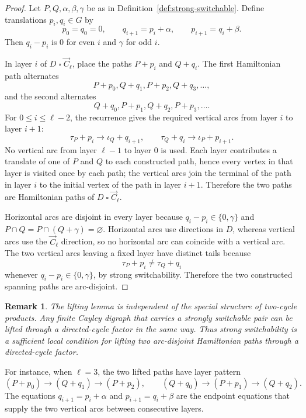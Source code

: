 \documentclass[11pt]{article}
\newtheorem{remark}[theorem]{Remark}
\newcommand{\Boxprod}{\mathbin{\square}}
\begin{document}
\begin{proof}
Let $P,Q,\alpha,\beta,\gamma$ be as in Definition~\ref{def:strong-switchable}.  Define translations $p_i,q_i\in G$ by
\[
        p_0=q_0=0,
        \qquad
        q_{i+1}=p_i+\alpha,
        \qquad
        p_{i+1}=q_i+\beta.
\]
Then $q_i-p_i$ is $0$ for even $i$ and $\gamma$ for odd $i$.

In layer $i$ of $D\Boxprod\vec C_\ell$, place the paths $P+p_i$ and $Q+q_i$.  The first Hamiltonian path alternates
\[
        P+p_0,
        Q+q_1,
        P+p_2,
        Q+q_3,
        \ldots,
\]
and the second alternates
\[
        Q+q_0,
        P+p_1,
        Q+q_2,
        P+p_3,
        \ldots.
\]
For $0\le i\le \ell-2$, the recurrence gives the required vertical arcs from layer $i$ to layer $i+1$:
\[
        \tau_P+p_i\to \iota_Q+q_{i+1},
        \qquad
        \tau_Q+q_i\to \iota_P+p_{i+1}.
\]
No vertical arc from layer $\ell-1$ to layer $0$ is used.  Each layer contributes a translate of one of $P$ and $Q$ to each constructed path, hence every vertex in that layer is visited once by each path; the vertical arcs join the terminal of the path in layer $i$ to the initial vertex of the path in layer $i+1$.  Therefore the two paths are Hamiltonian paths of $D\Boxprod\vec C_\ell$.

Horizontal arcs are disjoint in every layer because $q_i-p_i\in\{0,\gamma\}$ and $P\cap Q=P\cap(Q+\gamma)=\varnothing$.  Horizontal arcs use directions in $D$, whereas vertical arcs use the $\vec C_\ell$ direction, so no horizontal arc can coincide with a vertical arc.  The two vertical arcs leaving a fixed layer have distinct tails because
\[
        \tau_P+p_i\ne\tau_Q+q_i
\]
whenever $q_i-p_i\in\{0,\gamma\}$, by strong switchability.  Therefore the two constructed spanning paths are arc-disjoint.
\end{proof}

\begin{remark}
The lifting lemma is independent of the special structure of two-cycle products.  Any finite Cayley digraph that carries a strongly switchable pair can be lifted through a directed-cycle factor in the same way.  Thus strong switchability is a sufficient local condition for lifting two arc-disjoint Hamiltonian paths through a directed-cycle factor.
\end{remark}

For instance, when $\ell=3$, the two lifted paths have layer pattern
\[
        (P+p_0)\to(Q+q_1)\to(P+p_2),
        \qquad
        (Q+q_0)\to(P+p_1)\to(Q+q_2).
\]
The equations $q_{i+1}=p_i+\alpha$ and $p_{i+1}=q_i+\beta$ are the endpoint equations that supply the two vertical arcs between consecutive layers.
\end{document}
